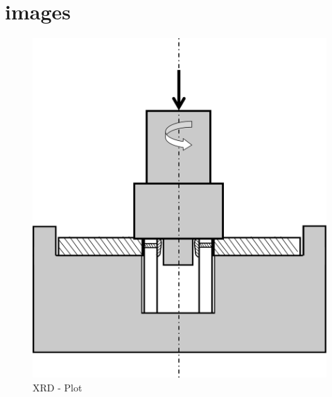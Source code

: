 \documentclass[3p]{elsarticle}
\begin{document}
\section{images}
\begin{figure}[!htbp]
\centering
\includegraphics[width=\textwidth,keepaspectratio]{images/welding-set-up.png}
\caption{XRD - Plot}
\label{fig:xrd-plot}
\end{figure}

\end{document}
